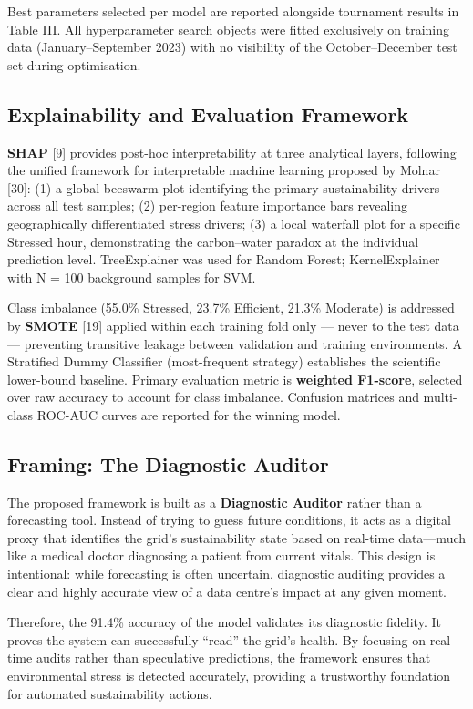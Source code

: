 \documentclass[conference]{IEEEtran}
\begin{document}
Best parameters selected per model are reported alongside tournament results in Table III. All hyperparameter search objects were fitted exclusively on training data (January–September 2023) with no visibility of the October–December test set during optimisation.

\subsection{Explainability and Evaluation Framework}
\textbf{SHAP} [9] provides post-hoc interpretability at three analytical layers, following the unified framework for interpretable machine learning proposed by Molnar [30]: (1) a global beeswarm plot identifying the primary sustainability drivers across all test samples; (2) per-region feature importance bars revealing geographically differentiated stress drivers; (3) a local waterfall plot for a specific Stressed hour, demonstrating the carbon–water paradox at the individual prediction level. TreeExplainer was used for Random Forest; KernelExplainer with N = 100 background samples for SVM.

Class imbalance (55.0\% Stressed, 23.7\% Efficient, 21.3\% Moderate) is addressed by \textbf{SMOTE} [19] applied within each training fold only — never to the test data — preventing transitive leakage between validation and training environments. A Stratified Dummy Classifier (most-frequent strategy) establishes the scientific lower-bound baseline. Primary evaluation metric is \textbf{weighted F1-score}, selected over raw accuracy to account for class imbalance. Confusion matrices and multi-class ROC-AUC curves are reported for the winning model.

\subsection{Framing: The Diagnostic Auditor}
The proposed framework is built as a \textbf{Diagnostic Auditor} rather than a forecasting tool. Instead of trying to guess future conditions, it acts as a digital proxy that identifies the grid's sustainability state based on real-time data—much like a medical doctor diagnosing a patient from current vitals. This design is intentional: while forecasting is often uncertain, diagnostic auditing provides a clear and highly accurate view of a data centre's impact at any given moment.

Therefore, the 91.4\% accuracy of the model validates its diagnostic fidelity. It proves the system can successfully ``read'' the grid's health. By focusing on real-time audits rather than speculative predictions, the framework ensures that environmental stress is detected accurately, providing a trustworthy foundation for automated sustainability actions.
\end{document}
